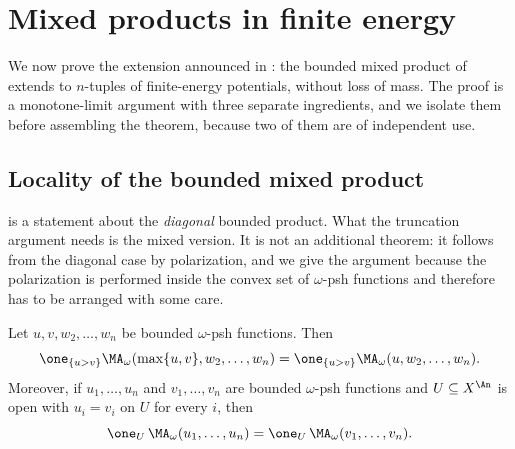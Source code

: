 \section{Mixed products in finite energy}
\label{sec:ch26-mixed-products}

We now prove the extension announced in
: the bounded mixed product of
 extends to $n$-tuples of finite-energy
potentials, without loss of mass.  The proof is a monotone-limit argument
with three separate ingredients, and we isolate them before assembling the
theorem, because two of them are of independent use.

\subsection{Locality of the bounded mixed product}
\label{sec:ch26-mixed-locality}

 is a statement about the \emph{diagonal}
bounded product.  What the truncation argument needs is the mixed version.
It is not an additional theorem: it follows from the diagonal case by
polarization, and we give the argument because the polarization is performed
inside the convex set of $\omega$-psh functions and therefore has to be
arranged with some care.

\begin{lemma}
\label{lem:ch26-mixed-locality}
Let $u,v,w_2,\ldots,w_n$ be bounded $\omega$-psh functions.  Then
\begin{equation}
\label{eq:ch26-mixed-maximum-principle}
 \one_{\{u>v\}}\MA_\omega(\max\{u,v\},w_2,\ldots,w_n)
 =\one_{\{u>v\}}\MA_\omega(u,w_2,\ldots,w_n).
\end{equation}
Moreover, if $u_1,\ldots,u_n$ and $v_1,\ldots,v_n$ are bounded
$\omega$-psh functions and $U\subseteq X^{\An}$ is open with
$u_i=v_i$ on $U$ for every $i$, then
\begin{equation}
\label{eq:ch26-mixed-locality}
 \one_U\,\MA_\omega(u_1,\ldots,u_n)
 =\one_U\,\MA_\omega(v_1,\ldots,v_n).
\end{equation}
\end{lemma}

